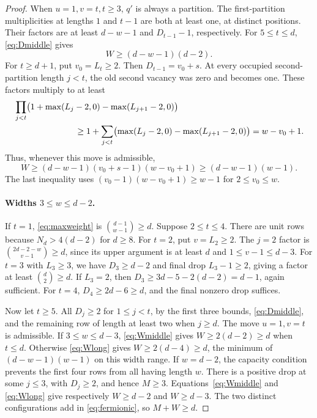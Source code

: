 \documentclass[11pt]{article}
\theoremstyle{remark}\newtheorem{remark}[theorem]{Remark}
\numberwithin{equation}{section}\setlength{\emergencystretch}{2em}
\begin{document}
\begin{proof}
When $u=1,v=t,t\ge3$, $q'$ is always a partition. The first-partition
multiplicities at lengths $1$ and $t-1$ are both at least one, at
distinct positions. Their factors are at least $d-w-1$ and
$D_{t-1}-1$, respectively. For $5\le t\le d$, \eqref{eq:Dmiddle} gives
\begin{equation}\label{eq:Wmiddle}
 W\ge(d-w-1)(d-2).
\end{equation}
For $t\ge d+1$, put $v_0=L_t\ge2$. Then $D_{t-1}=v_0+s$.
At every occupied second-partition length $j<t$, the old second vacancy
was zero and becomes one. These factors multiply to at least
\begin{align*}
 &\prod_{j<t}\bigl(1+\max(L_j-2,0)-\max(L_{j+1}-2,0)\bigr)\\
 &\hspace{25mm}\ge1+\sum_{j<t}
      \bigl(\max(L_j-2,0)-\max(L_{j+1}-2,0)\bigr)=w-v_0+1.
\end{align*}
Thus, whenever this move is admissible,
\begin{equation}\label{eq:Wlong}
 W\ge(d-w-1)(v_0+s-1)(w-v_0+1)\ge(d-w-1)(w-1).
\end{equation}
The last inequality uses
$(v_0-1)(w-v_0+1)\ge w-1$ for $2\le v_0\le w$.

\paragraph{Widths $3\le w\le d-2$.}
If $t=1$, \eqref{eq:maxweight} is $\binom{d-1}{w-1}\ge d$.
Suppose $2\le t\le4$. There are unit rows because
$N_d>4(d-2)$ for $d\ge8$.
For $t=2$, put $v=L_2\ge2$. The $j=2$ factor is
$\binom{2d-2-w}{v-1}\ge d$, since its upper argument is at least $d$
and $1\le v-1\le d-3$.
For $t=3$ with $L_3\ge3$, we have $D_3\ge d-2$ and final drop
$L_3-1\ge2$, giving a factor at least $\binom d2\ge d$.
If $L_3=2$, then $D_3\ge3d-5-2(d-2)=d-1$, again sufficient.
For $t=4$, $D_4\ge2d-6\ge d$, and the final nonzero drop suffices.

Now let $t\ge5$. All $D_j\ge2$ for $1\le j<t$, by the first three
bounds, \eqref{eq:Dmiddle}, and the remaining row of length at least two
when $j\ge d$. The move $u=1,v=t$ is admissible.
If $3\le w\le d-3$, \eqref{eq:Wmiddle} gives
$W\ge2(d-2)\ge d$ when $t\le d$. Otherwise \eqref{eq:Wlong} gives
$W\ge2(d-4)\ge d$, the minimum of $(d-w-1)(w-1)$ on this width range.
If $w=d-2$, the capacity condition prevents the first four rows from
all having length $w$. There is a positive drop at some $j\le3$, with
$D_j\ge2$, and hence $M\ge3$. Equations~\eqref{eq:Wmiddle} and
\eqref{eq:Wlong} give respectively $W\ge d-2$ and $W\ge d-3$.
The two distinct configurations add in \eqref{eq:fermionic}, so $M+W\ge d$.


\end{proof}
\end{document}
